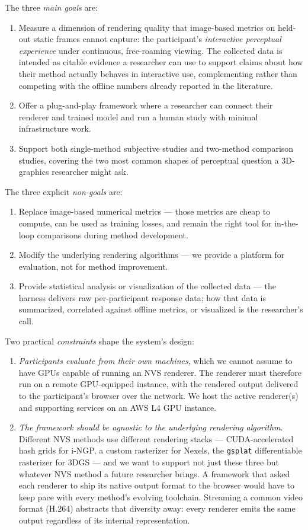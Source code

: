 The three \textit{main goals} are:
\begin{enumerate}
    \item Measure a dimension of rendering quality that image-based
    metrics on held-out static frames cannot capture: the participant's
    \emph{interactive perceptual experience} under continuous,
    free-roaming viewing. The collected data is intended as citable
    evidence a researcher can use to support claims about how their
    method actually behaves in interactive use, complementing rather
    than competing with the offline numbers already reported in the
    literature.
    \item Offer a plug-and-play framework where a researcher can connect
    their renderer and trained model and run a human study with minimal
    infrastructure work.
    \item Support both single-method subjective studies and two-method
    comparison studies, covering the two most common shapes of perceptual
    question a 3D-graphics researcher might ask.
\end{enumerate}
The three explicit \textit{non-goals} are:
\begin{enumerate}
    \item Replace image-based numerical metrics --- those metrics are
    cheap to compute, can be used as training losses, and remain the
    right tool for in-the-loop comparisons during method development.
    \item Modify the underlying rendering algorithms --- we provide a
    platform for evaluation, not for method improvement.
    \item Provide statistical analysis or visualization of the
    collected data --- the harness delivers raw per-participant
    response data; how that data is summarized, correlated against
    offline metrics, or visualized is the researcher's call.
\end{enumerate}
Two practical \textit{constraints} shape the system's design:
\begin{enumerate}
    \item \textit{Participants evaluate from their own machines},
    which we cannot assume to have GPUs capable of running an NVS
    renderer. The renderer must therefore run on a remote
    GPU-equipped instance, with the rendered output delivered to the
    participant's browser over the network. We host the active
    renderer(s) and supporting services on an AWS L4 GPU instance.
    \item \textit{The framework should be agnostic to the underlying
    rendering algorithm.} Different NVS methods use different
    rendering stacks --- CUDA-accelerated hash grids for i-NGP, a
    custom rasterizer for Nexels, the \texttt{gsplat} differentiable
    rasterizer for 3DGS --- and we want to support not just these
    three but whatever NVS method a future researcher brings. A
    framework that asked each renderer to ship its native output
    format to the browser would have to keep pace with every method's
    evolving toolchain. Streaming a common video format (H.264)
    abstracts that diversity away: every renderer emits the same
    output regardless of its internal representation.
\end{enumerate}
